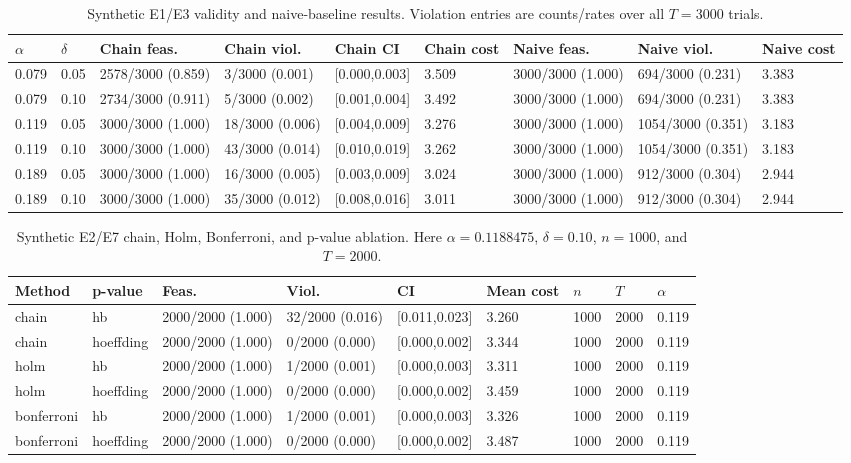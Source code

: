 \documentclass{ieeeaccess}
\begin{document}
\begingroup
\scriptsize
\setlength{\tabcolsep}{2pt}
\begin{table}[p]
\centering
\caption{Synthetic E1/E3 validity and naive-baseline results. Violation entries are counts/rates over all $T=3000$ trials.}
\label{tab:embedded-e1}
\begin{tabular}{@{}lllllllll@{}}
\toprule
$\alpha$ & $\delta$ & Chain feas. & Chain viol. & Chain CI & Chain cost & Naive feas. & Naive viol. & Naive cost \\
\midrule
0.079 & 0.05 & 2578/3000 (0.859) & 3/3000 (0.001) & [0.000,0.003] & 3.509 & 3000/3000 (1.000) & 694/3000 (0.231) & 3.383 \\
0.079 & 0.10 & 2734/3000 (0.911) & 5/3000 (0.002) & [0.001,0.004] & 3.492 & 3000/3000 (1.000) & 694/3000 (0.231) & 3.383 \\
0.119 & 0.05 & 3000/3000 (1.000) & 18/3000 (0.006) & [0.004,0.009] & 3.276 & 3000/3000 (1.000) & 1054/3000 (0.351) & 3.183 \\
0.119 & 0.10 & 3000/3000 (1.000) & 43/3000 (0.014) & [0.010,0.019] & 3.262 & 3000/3000 (1.000) & 1054/3000 (0.351) & 3.183 \\
0.189 & 0.05 & 3000/3000 (1.000) & 16/3000 (0.005) & [0.003,0.009] & 3.024 & 3000/3000 (1.000) & 912/3000 (0.304) & 2.944 \\
0.189 & 0.10 & 3000/3000 (1.000) & 35/3000 (0.012) & [0.008,0.016] & 3.011 & 3000/3000 (1.000) & 912/3000 (0.304) & 2.944 \\
\bottomrule
\end{tabular}
\end{table}

\begin{table}[p]
\centering
\caption{Synthetic E2/E7 chain, Holm, Bonferroni, and p-value ablation. Here $\alpha=0.1188475$, $\delta=0.10$, $n=1000$, and $T=2000$.}
\label{tab:embedded-e2}
\begin{tabular}{@{}lllllllll@{}}
\toprule
Method & p-value & Feas. & Viol. & CI & Mean cost & $n$ & $T$ & $\alpha$ \\
\midrule
chain & hb & 2000/2000 (1.000) & 32/2000 (0.016) & [0.011,0.023] & 3.260 & 1000 & 2000 & 0.119 \\
chain & hoeffding & 2000/2000 (1.000) & 0/2000 (0.000) & [0.000,0.002] & 3.344 & 1000 & 2000 & 0.119 \\
holm & hb & 2000/2000 (1.000) & 1/2000 (0.001) & [0.000,0.003] & 3.311 & 1000 & 2000 & 0.119 \\
holm & hoeffding & 2000/2000 (1.000) & 0/2000 (0.000) & [0.000,0.002] & 3.459 & 1000 & 2000 & 0.119 \\
bonferroni & hb & 2000/2000 (1.000) & 1/2000 (0.001) & [0.000,0.003] & 3.326 & 1000 & 2000 & 0.119 \\
bonferroni & hoeffding & 2000/2000 (1.000) & 0/2000 (0.000) & [0.000,0.002] & 3.487 & 1000 & 2000 & 0.119 \\
\bottomrule
\end{tabular}
\end{table}
\end{document}
